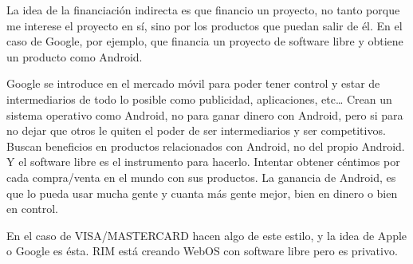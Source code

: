 La idea de la financiación indirecta es que financio un proyecto, no tanto
porque me interese el proyecto en sí, sino por los productos que puedan salir de
él. En el caso de Google, por ejemplo, que financia un proyecto de software
libre y obtiene un producto como Android.

Google se introduce en el mercado móvil para poder tener control y estar de
intermediarios de todo lo posible como publicidad, aplicaciones, etc\ldots
Crean un sistema operativo como Android, no para ganar dinero con Android, pero
si para no dejar que otros le quiten el poder de ser intermediarios y ser competitivos.
Buscan beneficios en productos relacionados con Android, no del propio Android.
Y el software libre es el instrumento para hacerlo. Intentar obtener céntimos
por cada compra/venta en el mundo con sus productos. La ganancia de Android, es
que lo pueda usar mucha gente y cuanta más gente mejor, bien en dinero o bien en
control.

En el caso de VISA/MASTERCARD hacen algo de este estilo, y la idea de Apple o
Google es ésta. RIM está creando WebOS con software libre pero es privativo.

